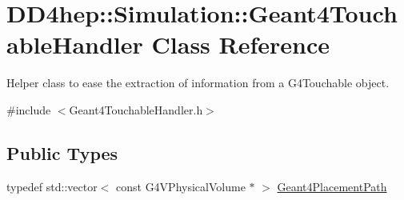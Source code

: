 \hypertarget{class_d_d4hep_1_1_simulation_1_1_geant4_touchable_handler}{
\section{DD4hep::Simulation::Geant4TouchableHandler Class Reference}
\label{class_d_d4hep_1_1_simulation_1_1_geant4_touchable_handler}
}


Helper class to ease the extraction of information from a G4Touchable object.  


{\ttfamily \#include $<$Geant4TouchableHandler.h$>$}\subsection*{Public Types}
\begin{DoxyCompactItemize}
\item 
typedef std::vector$<$ const G4VPhysicalVolume $\ast$ $>$ \hyperlink{class_d_d4hep_1_1_simulation_1_1_geant4_touchable_handler_a3ba887af055edecb3e6cfb04f2c7dc2c}{Geant4PlacementPath}
\end{DoxyCompactItemize}
